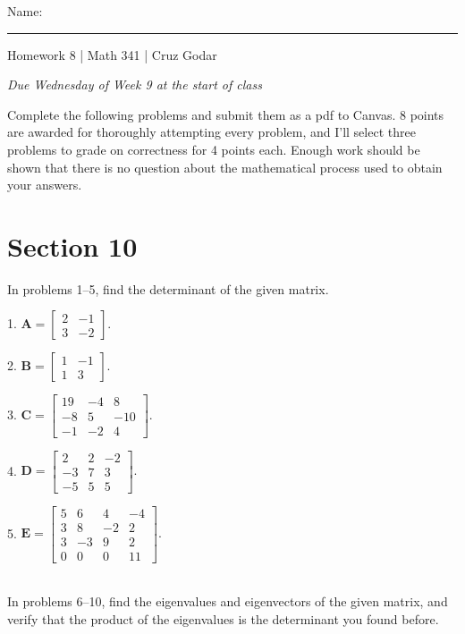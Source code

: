 \documentclass{article}
\begin{document}
\Large Name: \rule{2in}{0.15mm} \hfill Homework 8 | Math 341 | Cruz Godar \vspace{4pt} \normalsize

\textit{Due Wednesday of Week 9 at the start of class}

Complete the following problems and submit them as a pdf to Canvas. 8 points are awarded for thoroughly attempting every problem, and I'll select three problems to grade on correctness for 4 points each. Enough work should be shown that there is no question about the mathematical process used to obtain your answers.

\section{Section 10}

In problems 1--5, find the determinant of the given matrix.

1. $\displaystyle \mathbf{A} = \left[\begin{array}{cc}2& -1 \\ 3& -2\end{array}\right].$

2. $\displaystyle \mathbf{B} = \left[\begin{array}{cc}1& -1 \\ 1& 3\end{array}\right].$

3. $\displaystyle \mathbf{C} = \left[\begin{array}{ccc}19& -4& 8 \\ -8& 5& -10 \\ -1& -2& 4\end{array}\right].$

4. $\displaystyle \mathbf{D} = \left[\begin{array}{ccc}2& 2& -2 \\ -3& 7& 3 \\ -5& 5& 5\end{array}\right].$

5. $\displaystyle \mathbf{E} = \left[\begin{array}{cccc}5& 6& 4& -4 \\ 3& 8& -2& 2 \\ 3& -3& 9& 2 \\ 0& 0& 0& 11\end{array}\right].$

~\\

In problems 6--10, find the eigenvalues and eigenvectors of the given matrix, and verify that the product of the eigenvalues is the determinant you found before.
\end{document}
